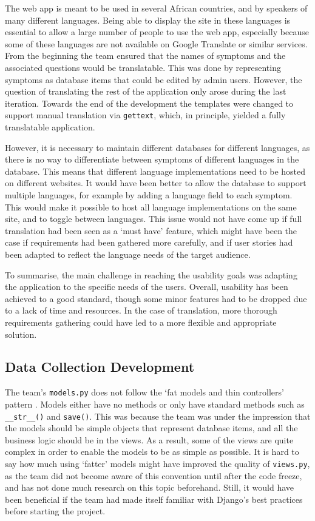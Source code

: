 \documentclass{l3proj}
\begin{document}
The web app is meant to be used in several African countries, and by speakers of many different languages. Being able to display the site in these languages is essential to allow a large number of people to use the web app, especially because some of these languages are not available on Google Translate or similar services. From the beginning the team ensured that the names of symptoms and the associated questions would be translatable. This was done by representing symptoms as database items that could be edited by admin users. However, the question of translating the rest of the application only arose during the last iteration. Towards the end of the development the templates were changed to support manual translation via \texttt{gettext}, which, in principle, yielded a fully translatable application. 

However, it is necessary to maintain different databases for different languages, as there is no way to differentiate between symptoms of different languages in the database. This means that different language implementations need to be hosted on different websites. It would have been better to allow the database to support multiple languages, for example by adding a language field to each symptom. This would make it possible to host all language implementations on the same site, and to toggle between languages. This issue would not have come up if full translation had been seen as a `must have' feature, which might have been the case if requirements had been gathered more carefully, and if user stories had been adapted to reflect the language needs of the target audience.

To summarise, the main challenge in reaching the usability goals was adapting the application to the specific needs of the users. Overall, usability has been achieved to a good standard, though some minor features had to be dropped due to a lack of time and resources. In the case of translation, more thorough requirements gathering could have led to a more flexible and appropriate solution.

\subsection{Data Collection Development}
\label{subsec:datacol}
The team's \texttt{models.py} does not follow the `fat models and thin controllers' pattern \cite{BestPractices}. Models either have no methods or only have standard methods such as \texttt{\_\_str\_\_()} and \texttt{save()}. This was because the team was under the impression that the models should be simple objects that represent database items, and all the business logic should be in the views. As a result, some of the views are quite complex in order to enable the models to be as simple as possible.  It is hard to say how much using `fatter' models might have improved the quality of \texttt{views.py}, as the team did not become aware of this convention until after the code freeze, and has not done much research on this topic beforehand. Still, it would have been beneficial if the team had made itself familiar with Django's best practices before starting the project.
\end{document}
